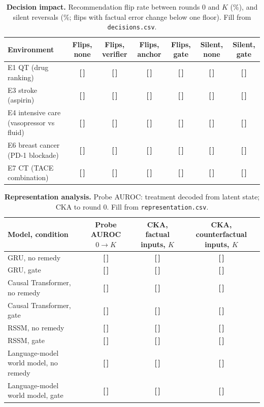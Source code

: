 \documentclass[11pt,a4paper]{article}
\newcommand{\T}{{\color{red}\textbf{[\,]}}}
\begin{document}
\FloatBarrier
\begin{table}[!htbp]\centering\footnotesize
\caption{\textbf{Decision impact.} Recommendation flip rate between rounds 0 and $K$ (\%), and silent reversals (\%; flips with factual error change below one floor). Fill from \texttt{decisions.csv}.}
\begin{tabularx}{\textwidth}{@{}p{3.9cm} C C C C C C@{}}\toprule
Environment & Flips, none & Flips, verifier & Flips, anchor & Flips, gate & Silent, none & Silent, gate\\\midrule
E1 QT (drug ranking) & \T & \T & \T & \T & \T & \T\\
E3 stroke (aspirin) & \T & \T & \T & \T & \T & \T\\
E4 intensive care (vasopressor vs fluid) & \T & \T & \T & \T & \T & \T\\
E6 breast cancer (PD-1 blockade) & \T & \T & \T & \T & \T & \T\\
E7 CT (TACE combination) & \T & \T & \T & \T & \T & \T\\
\bottomrule\end{tabularx}
\end{table}
\FloatBarrier
\begin{table}[!htbp]\centering\footnotesize
\caption{\textbf{Representation analysis.} Probe AUROC: treatment decoded from latent state; CKA to round 0. Fill from \texttt{representation.csv}.}
\begin{tabularx}{\textwidth}{@{}p{3.9cm} C C C@{}}\toprule
Model, condition & Probe AUROC $0\to K$ & CKA, factual inputs, $K$ & CKA, counterfactual inputs, $K$\\\midrule
GRU, no remedy & \T & \T & \T\\
GRU, gate & \T & \T & \T\\
Causal Transformer, no remedy & \T & \T & \T\\
Causal Transformer, gate & \T & \T & \T\\
RSSM, no remedy & \T & \T & \T\\
RSSM, gate & \T & \T & \T\\
Language-model world model, no remedy & \T & \T & \T\\
Language-model world model, gate & \T & \T & \T\\
\bottomrule\end{tabularx}
\end{table}
\FloatBarrier
\end{document}
